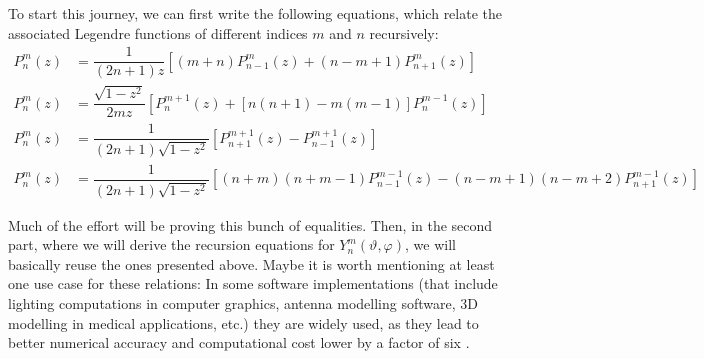 To start this journey, we can first write the following equations, which relate
the associated Legendre functions of different indices $m$ and $n$ recursively:
\begin{subequations}
  \begin{align}
    P^m_n(z) &= \dfrac{1}{(2n+1)z} \left[
       (m+n) P^m_{n-1}(z) + (n-m+1) P^m_{n+1}(z)
     \right] \label{kugel:eqn:rec-leg-1} \\
    P^m_n(z) &= \dfrac{\sqrt{1-z^2}}{2mz} \left[
        P^{m+1}_n(z) + [n(n+1)-m(m-1)] P^{m-1}_n(z)
      \right] \label{kugel:eqn:rec-leg-2} \\ 
    P^m_n(z) &= \dfrac{1}{(2n+1)\sqrt{1-z^2}} \left[
        P^{m+1}_{n+1}(z) - P^{m+1}_{n-1}(z)
      \right] \label{kugel:eqn:rec-leg-3} \\
    P^m_n(z) &= \dfrac{1}{(2n+1)\sqrt{1-z^2}} \left[
        (n+m)(n+m-1)P^{m-1}_{n-1}(z) - (n-m+1)(n-m+2)P^{m-1}_{n+1}(z)
      \right] \label{kugel:eqn:rec-leg-4}
  \end{align}
\end{subequations}

Much of the effort will be proving this bunch of equalities. Then, in the second
part, where we will derive the recursion equations for
$Y^m_n(\vartheta,\varphi)$, we will basically reuse the ones presented above.
Maybe it is worth mentioning at least one use case for these relations: In some
software implementations (that include lighting computations in computer
graphics, antenna modelling software, 3D modelling in medical applications,
etc.) they are widely used, as they lead to better numerical accuracy and
computational cost lower by a factor of six \cite{davari_new_2013}.

